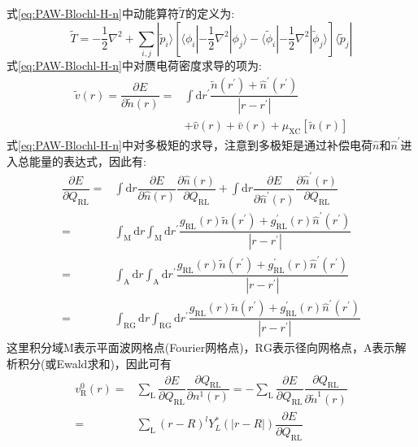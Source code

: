 式\eqref{eq:PAW-Blochl-H-n}中动能算符$\tilde T$的定义为:~
		\begin{equation}
			\tilde T=-\dfrac12\nabla^2+\sum_{i,j}|\tilde p_i\rangle[\langle\phi_i|-\dfrac12\nabla^2|\phi_j\rangle-\langle\tilde\phi_i|-\dfrac12\nabla^2|\tilde\phi_j\rangle]\langle\tilde p_j|
			\label{eq:PAW-Blochl-T}
		\end{equation}
式\eqref{eq:PAW-Blochl-H-n}中对赝电荷密度求导的项为:~
\begin{equation}
	\begin{aligned}
		\tilde v(r)=\dfrac{\partial E}{\partial\tilde n(r)}=&\int\mathrm{d}r^{\prime}\dfrac{\tilde n(r^{\prime})+\hat n^{\prime}(r^{\prime})}{|r-r^{\prime}|}\\
		&+\hat v(r)+\bar v(r)+\mu_{\mathrm{XC}}[\tilde n(r)]
	\end{aligned}
	\label{eq:PAW-Blochl-v}
\end{equation}
式\eqref{eq:PAW-Blochl-H-n}中对多极矩的求导，注意到多极矩是通过补偿电荷$\hat n$和$\hat n^{\prime}$进入总能量的表达式，因此有:~
\begin{displaymath}
	\begin{aligned}
		\dfrac{\partial E}{\partial Q_{\mathrm{RL}}}=&\int\mathrm{d}r\dfrac{\partial E}{\partial \hat n(r)}\dfrac{\partial\hat n(r)}{\partial Q_{\mathrm{RL}}}+\int\mathrm{d}r\dfrac{\partial E}{\partial \hat n^{\prime}(r)}\dfrac{\partial\hat n^{\prime}(r)}{\partial Q_{\mathrm{RL}}}\\
		=&\int_{\mathrm M}\mathrm{d}r\int_{\mathrm M}\mathrm{d}r^{\prime}\dfrac{g_{\mathrm{RL}}(r)\tilde n(r^{\prime})+g_{\mathrm{RL}}^{\prime}(r)\hat n^{\prime}(r^{\prime})}{|r-r^{\prime}|}\\
		=&\int_{\mathrm A}\mathrm{d}r\int_{\mathrm A}\mathrm{d}r^{\prime}\dfrac{g_{\mathrm{RL}}(r)\tilde n(r^{\prime})+g_{\mathrm{RL}}^{\prime}(r)\hat n^{\prime}(r^{\prime})}{|r-r^{\prime}|}\\
		=&\int_{\mathrm{RG}}\mathrm{d}r\int_{\mathrm{RG}}\mathrm{d}r^{\prime}\dfrac{g_{\mathrm{RL}}(r)\tilde n(r^{\prime})+g_{\mathrm{RL}}^{\prime}(r)\hat n^{\prime}(r^{\prime})}{|r-r^{\prime}|}
	\end{aligned}
\end{displaymath}
这里积分域$\mathrm{M}$表示平面波网格点(\textrm{Fourier}网格点)，$\mathrm{RG}$表示径向网格点，$\mathrm{A}$表示解析积分(或\textrm{Ewald}求和)，因此可有
\begin{equation}
	\begin{aligned}
		v_{\mathrm R}^0(r)=&\sum_{\mathrm L}\dfrac{\partial E}{\partial Q_{\mathrm{RL}}}\dfrac{\partial Q_{\mathrm{RL}}}{\partial n^1(r)}=-\sum_{\mathrm L}\dfrac{\partial E}{\partial Q_{\mathrm{RL}}}\dfrac{\partial Q_{\mathrm{RL}}}{\partial\tilde n^1(r)}\\
		=&\sum_{\mathrm L}(r-R)^lY_L^{\ast}(|r-R|)\dfrac{\partial E}{\partial Q_{\mathrm{RL}}}
	\end{aligned}
	\label{eq:PAW-Blochl-v_R}
\end{equation}
